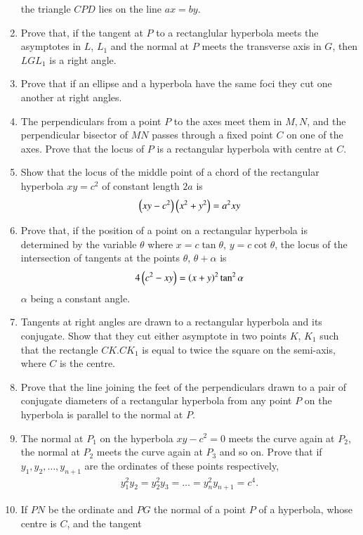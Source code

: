\begin{enumerate}[1.]
the triangle $CPD$ lies on the line $ax=by$.
\item Prove that, if the tangent at $P$ to a rectanglular hyperbola meets the asymptotes in $L$, $L_1$ and
the normal at $P$ meets the transverse axis in $G$, then $LGL_1$ is a right angle.
\item Prove that if an ellipse and a hyperbola have the same foci they cut one another at right
angles.
\item The perpendiculars from a point $P$ to the axes meet them in $M, N$, and the perpendicular bisector
of $MN$ passes through a fixed point $C$ on one of the axes.  Prove that the locus of $P$ is a rectangular
hyperbola with centre at $C$.
\item Show that the locus of the middle point of a chord of the rectangular 
hyperbola $xy=c^2$ of constant length $2a$ is
\begin{align*}
\left(xy-c^2\right)\left(x^2+y^2\right) = a^2xy
\end{align*}
\item Prove that, if the position of a point on  a rectangular hyperbola is determined by the
variable $\theta$ where $x = c \tan\theta$, $y = c\cot\theta$, the locus of the intersection of tangents at the 
points $\theta$, $\theta+\alpha$ is
\begin{align*}
4\left(c^2-xy\right) = \left(x+y\right)^2\tan^2\alpha
\end{align*}
$\alpha$ being a constant angle.
\item Tangents at right angles are drawn to a rectangular hyperbola and its
conjugate.  Show that they cut either asymptote in two points
$K$, $K_1$ such that the rectangle $CK.CK_1$ is equal to twice the square on
the semi-axis, where $C$ is the centre.
\item Prove that the line joining the feet of the perpendiculars drawn to a
pair of conjugate diameters of a rectangular hyperbola from any point $P$ on the
hyperbola is parallel to the normal at $P$.
\item  The normal at $P_1$ on the hyperbola $xy-c^2=0$ meets the curve again at $P_2$, the normal at $P_2$
 meets the curve again at $P_3$
and so on.  Prove that if $y_1,y_2,\dots, y_{n+1}$ are the ordinates of these points respectively,
\begin{align*}
y_1^2y_2 = y_2^2y_3 = \dots = y_n^2y_{n+1} = c^4.
\end{align*}
\item If $PN$ be the ordinate and $PG$ the normal of a point $P$ of a hyperbola, whose centre is $C$, and the tangent

\end{enumerate}
